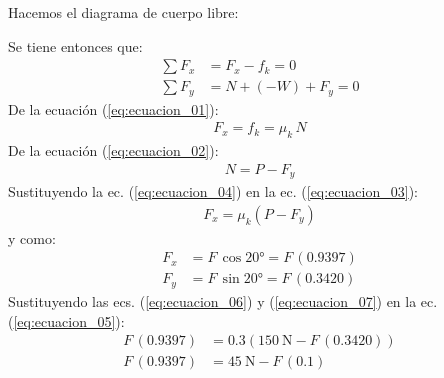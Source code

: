 \documentclass[14pt]{extarticle}
\begin{document}
\begin{enumerate}
\begin{figure}[H]
\end{figure}
Hacemos el diagrama de cuerpo libre:
\begin{figure}[H]
    \centering
\end{figure}
Se tiene entonces que:
\begin{align}
\sum F_{x} &= F_{x} - f_{k} = 0 \label{eq:ecuacion_01} \\[0.5em]
\sum F_{y} &= N + (-W) + F_{y} = 0 \label{eq:ecuacion_02}
\end{align}
De la ecuación (\ref{eq:ecuacion_01}):
\begin{align}
F_{x} = f_{k} = \mu_{k} \, N \label{eq:ecuacion_03}
\end{align}
De la ecuación (\ref{eq:ecuacion_02}):
\begin{align}
N = P - F_{y} \label{eq:ecuacion_04}
\end{align}
Sustituyendo la ec. (\ref{eq:ecuacion_04}) en la ec. (\ref{eq:ecuacion_03}):
\begin{align}
F_{x} = \mu_{k} (P - F_{y}) \label{eq:ecuacion_05}
\end{align}
y como:
\begin{align}
F_{x} &= F \, \cos \ang{20} = F \, (0.9397) \label{eq:ecuacion_06} \\[0.5em]
F_{y} &= F \, \sin \ang{20} = F \, (0.3420) \label{eq:ecuacion_07}
\end{align}
Sustituyendo las ecs. (\ref{eq:ecuacion_06}) y (\ref{eq:ecuacion_07}) en la ec. (\ref{eq:ecuacion_05}):
\begin{align*}
F \, (0.9397) &= 0.3 ( \SI{150}{\newton} - F \, (0.3420)) \\[0.5em]
F \, (0.9397) &= \SI{45}{\newton} - F \, (0.1) \\[0.5em]

\end{align*}
\end{enumerate}
\end{document}
